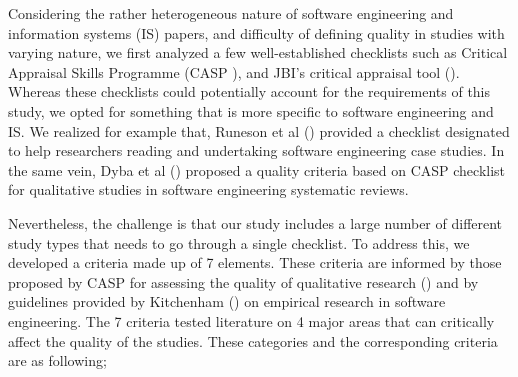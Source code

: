 \documentclass[review]{elsarticle}
\begin{document}
Considering the rather heterogeneous nature of software engineering and information systems (IS) papers, and difficulty of defining quality in studies with varying nature, we first analyzed a few well-established checklists such as Critical Appraisal Skills Programme (CASP \cite{CASP}), and JBI's critical appraisal tool (\cite{JBI}). Whereas these checklists could potentially account for the requirements of this study, we opted for something that is more specific to software engineering and IS. We realized for example that, Runeson et al (\cite{runeson2006we}) provided a checklist designated to help researchers reading and undertaking software engineering case studies. In the same vein, Dyba et al (\cite{dybaa2008empirical}) proposed a quality criteria based on CASP checklist for qualitative studies in software engineering systematic reviews. 

Nevertheless, the challenge is that our study includes a large number of different study types that needs to go through a single checklist. To address this, we developed a criteria made up of 7 elements. These criteria are informed by those proposed by CASP for assessing the quality of qualitative research (\cite{CASP}) and by guidelines provided by Kitchenham (\cite{kitchenham2002preliminary}) on empirical research in software engineering. The 7 criteria tested literature on 4 major areas that can critically affect the quality of the studies. These categories and the corresponding criteria are as following;
\end{document}
